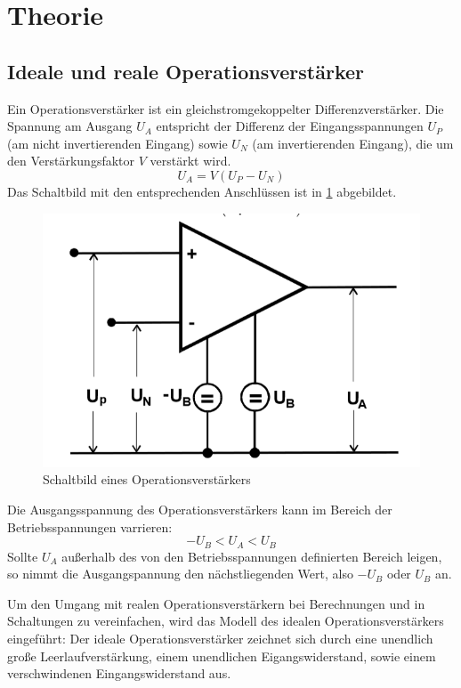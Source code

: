 \section{Theorie}

\subsection{Ideale und reale Operationsverst{\"a}rker}
Ein Operationsverstärker ist ein gleichstromgekoppelter Differenzverstärker. Die Spannung am Ausgang $U_A$ entspricht der Differenz der Eingangsspannungen $U_P$ (am nicht invertierenden Eingang)
sowie $U_N$ (am invertierenden Eingang), die um den Verstärkungsfaktor $V$ verstärkt wird.
\begin{equation}
U_A = V (U_P - U_N)
\end{equation}
Das Schaltbild mit den entsprechenden Anschlüssen ist in \ref{abb:op} abgebildet.
\begin{figure}
 	\centering
 	\includegraphics[width=\textwidth]{img/op.png}
 	\caption{Schaltbild eines Operationsverstärkers}
 	\label{abb:op}
\end{figure}
Die Ausgangsspannung des Operationsverstärkers kann im Bereich der Betriebsspannungen varrieren:
\begin{equation}
-U_B < U_A < U_B
\end{equation}
Sollte $U_A$ außerhalb des von den Betriebsspannungen definierten Bereich leigen, so nimmt die Ausgangspannung den nächstliegenden Wert, also $-U_B$ oder $U_B$ an.

Um den Umgang mit realen Operationsverstärkern bei Berechnungen und in Schaltungen zu vereinfachen, wird das Modell des idealen Operationsverstärkers eingeführt:
Der ideale Operationsverstärker zeichnet sich durch eine unendlich große Leerlaufverstärkung, einem unendlichen Eigangswiderstand, sowie einem verschwindenen Eingangswiderstand aus.

